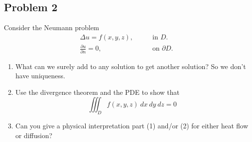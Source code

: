 \documentclass{ben}
\begin{document}
\subsection{Problem 2}
Consider the Neumann problem
\begin{align*}
    \Delta u = f(x, y, z),&\qquad \text{in $D$.}\\
    \frac{\partial u}{\partial n} = 0,&\qquad \text{on $\partial D$.}
\end{align*}
\begin{enumerate}[label=(\arabic*)]
    \item What can we surely add to any solution to get another solution?
    So we don't have uniqueness.
    \item Use the divergence theorem and the PDE to show that
    \[
        \iiint_D f(x, y, z)\ dx\ dy\ dz = 0
    \]
    \item Can you give a physical interpretation part (1) and/or (2)
    for either heat flow or diffusion?
\end{enumerate}
\end{document}
